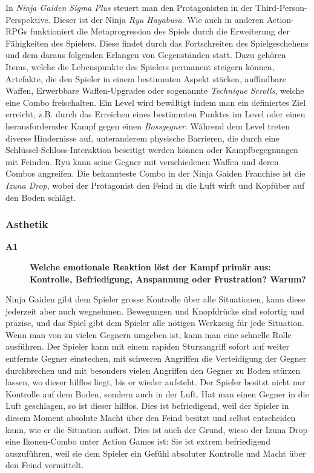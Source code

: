 \documentclass[../Main.tex]{subfiles}
\begin{document}
In \textit{Ninja Gaiden Sigma Plus} steuert man den Protagonisten in der Third-Person-Perspektive. Dieser ist der Ninja \textit{Ryu Hayabusa}. Wie auch in anderen Action-RPGs funktioniert die Metaprogression des Spiels durch die Erweiterung der Fähigkeiten des Spielers. Diese findet durch das Fortschreiten des Spielgeschehens und dem daraus folgenden Erlangen von Gegenständen statt. Dazu gehören Items, welche die Lebenspunkte des Spielers permanent steigern können, Artefakte, die den Spieler in einem bestimmten Aspekt stärken, auffindbare Waffen, Erwerbbare Waffen-Upgrades oder sogenannte \textit{Technique Scrolls}, welche eine Combo freischalten. Ein Level wird bewältigt indem man ein definiertes Ziel erreicht, z.B. durch das Erreichen eines bestimmten Punktes im Level oder einen herausfordernder Kampf gegen einen \textit{Bossgegner}. Während dem Level treten diverse Hindernisse auf, unteranderem physische Barrieren, die durch eine Schlüssel-Schloss-Interaktion beseitigt werden können oder Kampfbegegnungen mit Feinden. Ryu kann seine Gegner mit verschiedenen Waffen und deren Combos angreifen. Die bekannteste Combo in der Ninja Gaiden Franchise ist die \textit{Izuna Drop}, wobei der Protagonist den Feind in die Luft wirft und Kopfüber auf den Boden schlägt.


\subsubsection{Asthetik}

\begin{description}
    \item[\textbf{A1}] \textbf{Welche emotionale Reaktion löst der Kampf primär aus: Kontrolle, Befriedigung, Anspannung oder Frustration? Warum?}
\end{description}

Ninja Gaiden gibt dem Spieler grosse Kontrolle über alle Situationen, kann diese jederzeit aber auch wegnehmen. Bewegungen und Knopfdrücke sind sofortig und präzise, und das Spiel gibt dem Spieler alle nötigen Werkzeug für jede Situation. Wenn man von zu vielen Gegnern umgeben ist, kann man eine schnelle Rolle ausführen. Der Spieler kann mit einem rapiden Sturzangriff sofort auf weiter entfernte Gegner einstechen, mit schweren Angriffen die Verteidigung der Gegner durchbrechen und mit besonders vielen Angriffen den Gegner zu Boden stürzen lassen, wo dieser hilflos liegt, bis er wieder aufsteht. Der Spieler besitzt nicht nur Kontrolle auf dem Boden, sondern auch in der Luft. Hat man einen Gegner in die Luft geschlagen, so ist dieser hilflos. Dies ist befriedigend, weil der Spieler in diesem Moment absolute Macht über den Feind besitzt und selbst entscheiden kann, wie er die Situation auflöst. Dies ist auch der Grund, wieso der Izuna Drop eine Ikonen-Combo unter Action Games ist: Sie ist extrem befriedigend auszuführen, weil sie dem Spieler ein Gefühl absoluter Kontrolle und Macht über den Feind vermittelt.
\end{document}
